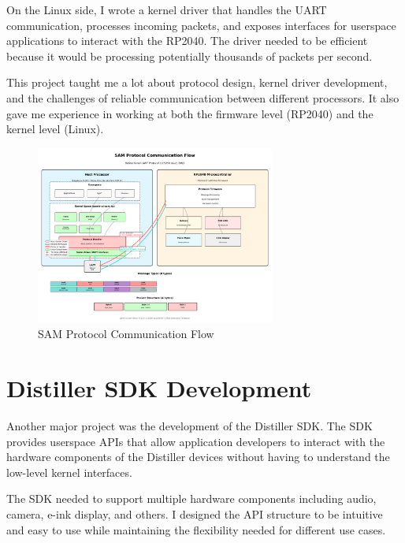 \documentclass[12pt,a4paper]{report}
\begin{document}
\vspace{0.3cm}

On the Linux side, I wrote a kernel driver that handles the UART communication, processes incoming packets, and exposes interfaces for userspace applications to interact with the RP2040. The driver needed to be efficient because it would be processing potentially thousands of packets per second.

\vspace{0.3cm}

This project taught me a lot about protocol design, kernel driver development, and the challenges of reliable communication between different processors. It also gave me experience in working at both the firmware level (RP2040) and the kernel level (Linux).

\begin{figure}[h]
    \centering
    \includegraphics[width=0.7\textwidth]{sam-protocol-flow.png}
    \caption{SAM Protocol Communication Flow}
\end{figure}

\section{Distiller SDK Development}

Another major project was the development of the Distiller SDK. The SDK provides userspace APIs that allow application developers to interact with the hardware components of the Distiller devices without having to understand the low-level kernel interfaces.

\vspace{0.3cm}

The SDK needed to support multiple hardware components including audio, camera, e-ink display, and others. I designed the API structure to be intuitive and easy to use while maintaining the flexibility needed for different use cases.
\end{document}
